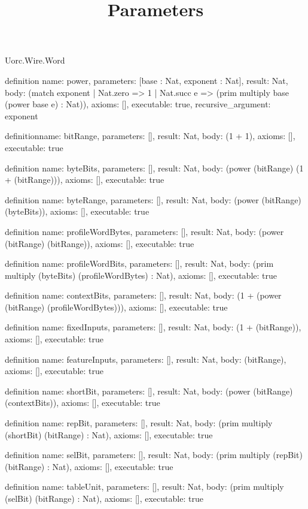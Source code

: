 \begin{lexlean}{Uorc.Wire.Word}
\title{Parameters}
\begin{semanticmodule}
definition{
  name: power,
  parameters: [base : Nat, exponent : Nat],
  result: Nat,
  body: (match exponent | Nat.zero => 1 | Nat.succ e => (prim multiply base (power base e) : Nat)),
  axioms: [],
  executable: true,
  recursive_argument: exponent
}

definition{name: bitRange, parameters: [], result: Nat, body: (1 + 1), axioms: [], executable: true}

definition{
  name: byteBits,
  parameters: [],
  result: Nat,
  body: (power (bitRange) (1 + (bitRange))),
  axioms: [],
  executable: true
}

definition{
  name: byteRange,
  parameters: [],
  result: Nat,
  body: (power (bitRange) (byteBits)),
  axioms: [],
  executable: true
}

definition{
  name: profileWordBytes,
  parameters: [],
  result: Nat,
  body: (power (bitRange) (bitRange)),
  axioms: [],
  executable: true
}

definition{
  name: profileWordBits,
  parameters: [],
  result: Nat,
  body: (prim multiply (byteBits) (profileWordBytes) : Nat),
  axioms: [],
  executable: true
}

definition{
  name: contextBits,
  parameters: [],
  result: Nat,
  body: (1 + (power (bitRange) (profileWordBytes))),
  axioms: [],
  executable: true
}

definition{
  name: fixedInputs,
  parameters: [],
  result: Nat,
  body: (1 + (bitRange)),
  axioms: [],
  executable: true
}

definition{
  name: featureInputs,
  parameters: [],
  result: Nat,
  body: (bitRange),
  axioms: [],
  executable: true
}

definition{
  name: shortBit,
  parameters: [],
  result: Nat,
  body: (power (bitRange) (contextBits)),
  axioms: [],
  executable: true
}

definition{
  name: repBit,
  parameters: [],
  result: Nat,
  body: (prim multiply (shortBit) (bitRange) : Nat),
  axioms: [],
  executable: true
}

definition{
  name: selBit,
  parameters: [],
  result: Nat,
  body: (prim multiply (repBit) (bitRange) : Nat),
  axioms: [],
  executable: true
}

definition{
  name: tableUnit,
  parameters: [],
  result: Nat,
  body: (prim multiply (selBit) (bitRange) : Nat),
  axioms: [],
  executable: true
}


\end{semanticmodule}
\end{lexlean}
